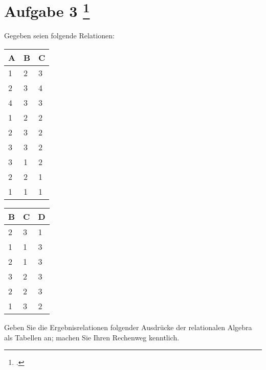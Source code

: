 \documentclass{lehramt-informatik-aufgabe}
\begin{document}
\liAufgabenTitel{}
\section{Aufgabe 3
\footcite{66116:2019:03}}

Gegeben seien folgende Relationen:


\begin{tabular}{|l|l|l|}
\hline
A & B & C \\ \hline
1 & 2 & 3 \\ \hline
2 & 3 & 4 \\ \hline
4 & 3 & 3 \\ \hline
1 & 2 & 2 \\ \hline
2 & 3 & 2 \\ \hline
3 & 3 & 2 \\ \hline
3 & 1 & 2 \\ \hline
2 & 2 & 1 \\ \hline
1 & 1 & 1 \\ \hline
\end{tabular}


\begin{tabular}{|l|l|l|}
\hline
B & C & D \\ \hline
2 & 3 & 1 \\ \hline
1 & 1 & 3 \\ \hline
2 & 1 & 3 \\ \hline
3 & 2 & 3 \\ \hline
2 & 2 & 3 \\ \hline
1 & 3 & 2 \\ \hline
\end{tabular}

Geben Sie die Ergebnisrelationen folgender Ausdrücke der relationalen
Algebra als Tabellen an; machen Sie Ihren Rechenweg kenntlich.


\end{document}
